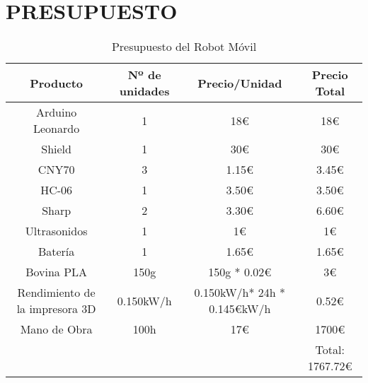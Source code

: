 \chapter{PRESUPUESTO}

\begin{center}
\begin{table}[h!]
  \centering
  \begin{tabular}{|c|c|c|c|}
  \hline
  Producto & Nº de unidades & Precio/Unidad & Precio Total \\ \hline
  \hline
  Arduino Leonardo & 1 & 18\euro & 18\euro\\  \hline
  Shield & 1 & 30\euro & 30\euro \\ \hline
  CNY70 & 3 & 1.15\euro &  3.45\euro \\ \hline
  HC-06 & 1 & 3.50\euro & 3.50\euro\\ \hline
  Sharp & 2 & 3.30\euro & 6.60\euro \\ \hline
  Ultrasonidos & 1 & 1\euro & 1\euro \\ \hline
  Batería & 1 & 1.65\euro & 1.65\euro \\ \hline
  Bovina PLA & 150g & 150g * 0.02\euro & 3\euro\\ \hline
  Rendimiento de la impresora 3D & 0.150kW/h & 0.150kW/h* 24h * 0.145\euro kW/h & 0.52\euro \\ \hline
  Mano de Obra & 100h & 17\euro & 1700\euro \\ \hline
  & & & Total: 1767.72\euro \\ \hline
  \end{tabular}
  \caption{Presupuesto del Robot Móvil}
  \label{Presupuesto}

\end{table}
\end{center}
